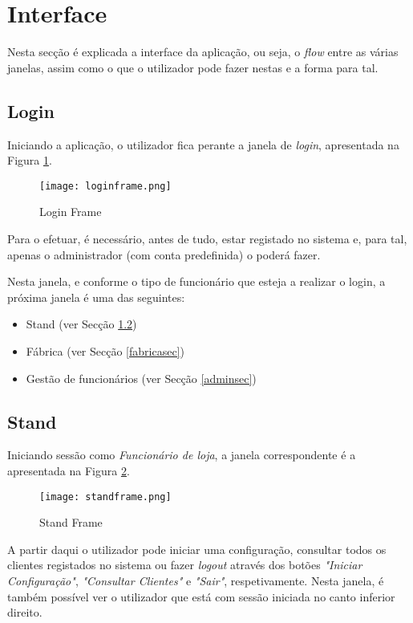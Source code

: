 \section{Interface}

Nesta secção é explicada a interface da aplicação, ou seja, o \textit{flow} entre as várias janelas, assim como o que o utilizador pode fazer nestas e a forma para tal.

\subsection{Login}
Iniciando a aplicação, o utilizador fica perante a janela de \textit{login}, apresentada na Figura \ref{loginframe}. 
\begin{figure}[H]
	\centering
	\texttt{[image: loginframe.png]}
	\caption{Login Frame}
	\label{loginframe}
\end{figure}

Para o efetuar, é necessário, antes de tudo, estar registado no sistema e, para tal, apenas o administrador (com conta predefinida) o poderá fazer.

Nesta janela, e conforme o tipo de funcionário que esteja a realizar o login, a próxima janela é uma das seguintes:
\begin{itemize}
	\item Stand (ver Secção \ref{standsec})
	\item Fábrica (ver Secção \ref{fabricasec})
	\item Gestão de funcionários (ver Secção \ref{adminsec})
\end{itemize}

\subsection{Stand}
\label{standsec}

Iniciando sessão como \textit{Funcionário de loja}, a janela correspondente é a apresentada na Figura \ref{standframe}.
\begin{figure}[H]
	\centering
	\texttt{[image: standframe.png]}
	\caption{Stand Frame}
	\label{standframe}
\end{figure}

A partir daqui o utilizador pode iniciar uma configuração, consultar todos os clientes registados no sistema ou fazer \textit{logout} através dos botões \textit{"Iniciar Configuração"}, \textit{"Consultar Clientes"} e \textit{"Sair"}, respetivamente. Nesta janela, é também possível ver o utilizador que está com sessão iniciada no canto inferior direito.

